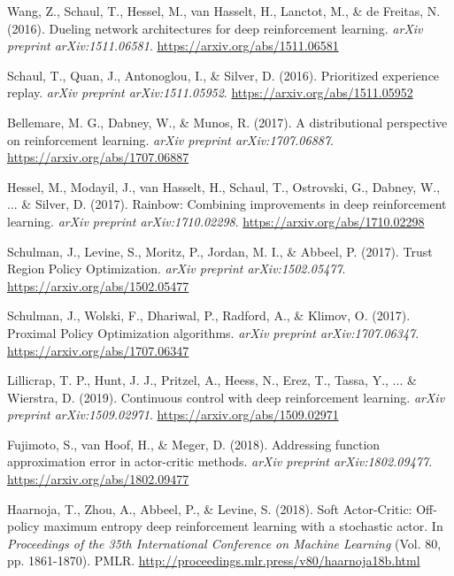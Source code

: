 \documentclass[12pt,a4paper]{report}
\begin{document}
\begin{thebibliography}{99}
Wang, Z., Schaul, T., Hessel, M., van Hasselt, H., Lanctot, M., \& de Freitas, N. (2016).
Dueling network architectures for deep reinforcement learning.
\textit{arXiv preprint arXiv:1511.06581}.
\url{https://arxiv.org/abs/1511.06581}

Schaul, T., Quan, J., Antonoglou, I., \& Silver, D. (2016).
Prioritized experience replay.
\textit{arXiv preprint arXiv:1511.05952}.
\url{https://arxiv.org/abs/1511.05952}

Bellemare, M. G., Dabney, W., \& Munos, R. (2017).
A distributional perspective on reinforcement learning.
\textit{arXiv preprint arXiv:1707.06887}.
\url{https://arxiv.org/abs/1707.06887}

Hessel, M., Modayil, J., van Hasselt, H., Schaul, T., Ostrovski, G., Dabney, W., ... \& Silver, D. (2017).
Rainbow: Combining improvements in deep reinforcement learning.
\textit{arXiv preprint arXiv:1710.02298}.
\url{https://arxiv.org/abs/1710.02298}


Schulman, J., Levine, S., Moritz, P., Jordan, M. I., \& Abbeel, P. (2017).
Trust Region Policy Optimization.
\textit{arXiv preprint arXiv:1502.05477}.
\url{https://arxiv.org/abs/1502.05477}

Schulman, J., Wolski, F., Dhariwal, P., Radford, A., \& Klimov, O. (2017).
Proximal Policy Optimization algorithms.
\textit{arXiv preprint arXiv:1707.06347}.
\url{https://arxiv.org/abs/1707.06347}

Lillicrap, T. P., Hunt, J. J., Pritzel, A., Heess, N., Erez, T., Tassa, Y., ... \& Wierstra, D. (2019).
Continuous control with deep reinforcement learning.
\textit{arXiv preprint arXiv:1509.02971}.
\url{https://arxiv.org/abs/1509.02971}

Fujimoto, S., van Hoof, H., \& Meger, D. (2018).
Addressing function approximation error in actor-critic methods.
\textit{arXiv preprint arXiv:1802.09477}.
\url{https://arxiv.org/abs/1802.09477}

Haarnoja, T., Zhou, A., Abbeel, P., \& Levine, S. (2018).
Soft Actor-Critic: Off-policy maximum entropy deep reinforcement learning with a stochastic actor.
In \textit{Proceedings of the 35th International Conference on Machine Learning} (Vol. 80, pp. 1861-1870). PMLR.
\url{http://proceedings.mlr.press/v80/haarnoja18b.html}


\end{thebibliography}
\end{document}
